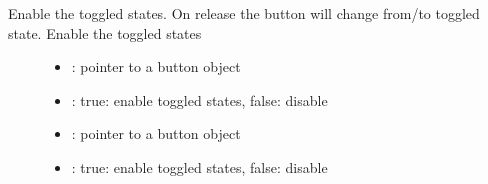 \documentclass[letterpaper,10pt,english]{sphinxmanual}
\begin{document}

\begin{fulllineitems}
\label{\detokenize{object-types/btn:_CPPv417lv_btn_set_toggleP8lv_obj_tb}}%
\pysigstartmultiline
{}\label{\detokenize{object-types/btn:lv__btn_8h_1ad7515c0889dc6c1658b88d4319fef67b}}%
\pysigstopmultiline
Enable the toggled states. On release the button will change from/to toggled state. 
Enable the toggled states 
\begin{description}
\item[{}] \leavevmode\begin{itemize}
\item {} 
: pointer to a button object 

\item {} 
: true: enable toggled states, false: disable

\end{itemize}

\item[{}] \leavevmode\begin{itemize}
\item {} 
: pointer to a button object 

\item {} 
: true: enable toggled states, false: disable 

\end{itemize}

\end{description}


\end{fulllineitems}

\end{document}
